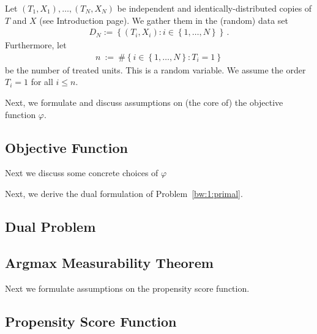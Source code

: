 Let $(T_1,X_1),\ldots,(T_N,X_N)$ be independent and identically-distributed copies of $T$ and $X$ (see Introduction page). 
We gather them in the (random) data set 
\begin{gather*}
D_N:=\left\{ (T_i,X_i)\colon i\in \left\{ 1,\ldots,N \right\} \right\}
\,.
\end{gather*}
Furthermore, let
\begin{gather*}
  n
  \ 
  :=
  \ 
  \# 
  \left\{ 
    i\in \left\{ 1,\ldots,N \right\}
    \colon
    T_i=1
  \right\}
\end{gather*}
be the number of treated units. This is a random variable. We assume the order $T_i=1$ for all $i\le n$.



Next, we formulate and discuss assumptions on (the core of) the objective function $\varphi$.
\subsection{Objective Function}


Next we discuss some concrete choices of $\varphi$




Next, we derive the dual formulation of Problem~\ref{bw:1:primal}.
\subsection{Dual Problem}




\subsection{Argmax Measurability Theorem}

Next we formulate assumptions on the propensity score function.
\subsection{Propensity Score Function}



